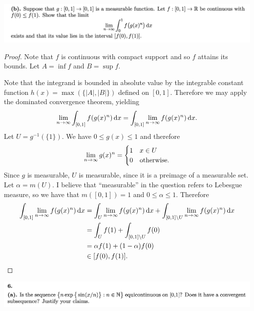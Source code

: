 \begin{mdframed}
  \includegraphics[width=400pt]{img/analysis--berkeley-202a-final-cd70.png}
\end{mdframed}

\begin{proof}

  Note that $f$ is continuous with compact support and so $f$ attains its bounds. Let $A = \inf f$
  and $B = \sup f$.

  Note that the integrand is bounded in absolute value by the integrable constant
  function $h(x) = \max(\{|A|, |B|\})$ defined on $[0, 1]$. Therefore we may apply the dominated
  convergence theorem, yielding
  \begin{align*}
    \limninf \int_{[0, 1]} f(g(x)^n) \dx = \int_{[0, 1]} \limninf  f(g(x)^n) \dx.
  \end{align*}
  Let $U = g^{-1}(\{1\})$. We have $0 \leq g(x) \leq 1$ and therefore
  \begin{align*}
    \limninf g(x)^n =
    \begin{cases}
      1 & x \in U \\
      0 & \text{otherwise}.
    \end{cases}
  \end{align*}
  Since $g$ is measurable, $U$ is measurable, since it is a preimage of a measurable set. Let $\alpha = m(U)$.
  I believe that ``measurable​'' in the question refers to Lebesgue measure, so we have that $m([0, 1]) = 1$
  and $0 \leq \alpha \leq 1$. Therefore
  \begin{align*}
    \int_{[0, 1]} \limninf  f(g(x)^n) \dx
    &= \int_U \limninf  f(g(x)^n) \dx + \int_{[0, 1] \setminus U} \limninf  f(g(x)^n) \dx \\
    &= \int_U f(1) + \int_{[0, 1] \setminus U} f(0) \\
    &= \alpha f(1) + (1 - \alpha) f(0) \\
    &\in [f(0), f(1)].
  \end{align*}
\end{proof}


\newpage
\begin{mdframed}
  \includegraphics[width=400pt]{img/analysis--berkeley-202a-final-f5b6.png}
\end{mdframed}

